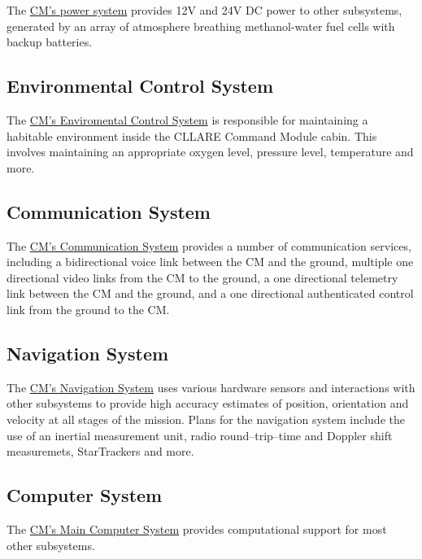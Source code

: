 \documentclass{report}
\begin{document}
The \href{http://cstart.org/wiki/CLLARE_CM_Power_System}{CM's power system} provides 12V and 24V DC power to other subsystems, generated by an array of atmosphere breathing methanol-water fuel cells with backup batteries.

\subsection{Environmental Control System}

The \href{http://cstart.org/wiki/CLLARE_Environmental_Control_System}{CM's Enviromental Control System} is responsible for maintaining a habitable environment inside the CLLARE Command Module cabin. This involves maintaining an appropriate oxygen level, pressure level, temperature and more.

\subsection{Communication System}

The \href{http://cstart.org/wiki/CLLARE_CM_Communication_System}{CM's Communication System} provides a number of communication services, including a bidirectional voice link between the CM and the ground, multiple one directional video links from the CM to the ground, a one directional telemetry link between the CM and the ground, and a one directional authenticated control link from the ground to the CM.

\subsection{Navigation System}

The \href{http://cstart.org/wiki/CLLARE_CM_Navigation_System}{CM's Navigation System} uses various hardware sensors and interactions with other subsystems to provide high accuracy estimates of position, orientation and velocity at all stages of the mission.  Plans for the navigation system include the use of an inertial measurement unit, radio round--trip--time and Doppler shift measuremets, StarTrackers and more.

\subsection{Computer System}

The \href{http://cstart.org/wiki/CLLARE_Main_Computer_System}{CM's Main Computer System} provides computational support for most other subsystems.
\end{document}
